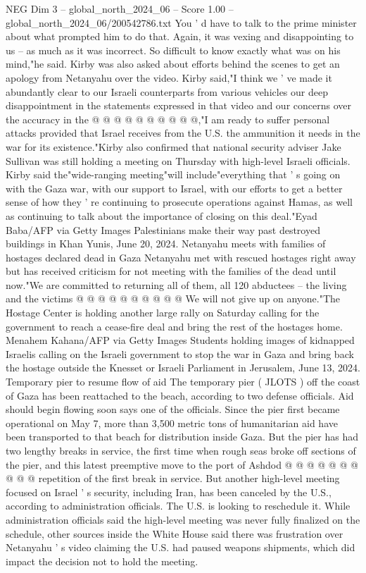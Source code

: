 \begin{textsample}{NEG Dim 3 – global\_north\_2024\_06 – Score 1.00 – global\_north\_2024\_06/200542786.txt}
You ' d have to talk to the prime minister about what prompted him to do that.
Again, it was vexing and disappointing to us -- as much as it was incorrect.
So difficult to know exactly what was on his mind,"he said.
Kirby was also asked about efforts behind the scenes to get an apology from Netanyahu over the video.
Kirby said,"I think we ' ve made it abundantly clear to our Israeli counterparts from various vehicles our deep disappointment in the statements expressed in that video and our concerns over the accuracy in the @ @ @ @ @ @ @ @ @ @,"I am ready to suffer personal attacks provided that Israel receives from the U.S. the ammunition it needs in the war for its existence."Kirby also confirmed that national security adviser Jake Sullivan was still holding a meeting on Thursday with high-level Israeli officials.
Kirby said the"wide-ranging meeting"will include"everything that ' s going on with the Gaza war, with our support to Israel, with our efforts to get a better sense of how they ' re continuing to prosecute operations against Hamas, as well as continuing to talk about the importance of closing on this deal."Eyad Baba/AFP via Getty Images Palestinians make their way past destroyed buildings in Khan Yunis, June 20, 2024.
Netanyahu meets with families of hostages declared dead in Gaza Netanyahu met with rescued hostages right away but has received criticism for not meeting with the families of the dead until now."We are committed to returning all of them, all 120 abductees -- the living and the victims @ @ @ @ @ @ @ @ @ @ We will not give up on anyone."The Hostage Center is holding another large rally on Saturday calling for the government to reach a cease-fire deal and bring the rest of the hostages home.
Menahem Kahana/AFP via Getty Images Students holding images of kidnapped Israelis calling on the Israeli government to stop the war in Gaza and bring back the hostage outside the Knesset or Israeli Parliament in Jerusalem, June 13, 2024.
Temporary pier to resume flow of aid The temporary pier ( JLOTS ) off the coast of Gaza has been reattached to the beach, according to two defense officials.
Aid should begin flowing soon says one of the officials.
Since the pier first became operational on May 7, more than 3,500 metric tons of humanitarian aid have been transported to that beach for distribution inside Gaza.
But the pier has had two lengthy breaks in service, the first time when rough seas broke off sections of the pier, and this latest preemptive move to the port of Ashdod @ @ @ @ @ @ @ @ @ @ repetition of the first break in service.
But another high-level meeting focused on Israel ' s security, including Iran, has been canceled by the U.S., according to administration officials.
The U.S. is looking to reschedule it.
While administration officials said the high-level meeting was never fully finalized on the schedule, other sources inside the White House said there was frustration over Netanyahu ' s video claiming the U.S. had paused weapons shipments, which did impact the decision not to hold the meeting.

\end{textsample}
